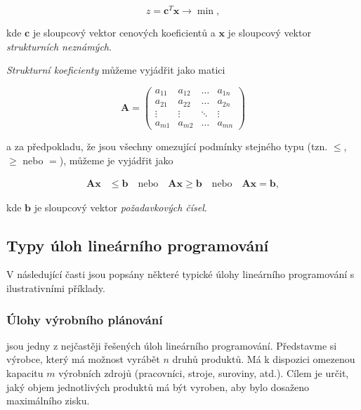 \begin{equation}
    z = \bm{c}^T\bm{x} \rightarrow \min,
\end{equation}

kde $\bm{c}$ je sloupcový vektor cenových koeficientů a $\bm{x}$ je sloupcový vektor \textit{strukturních neznámých}.

\textit{Strukturní koeficienty} můžeme vyjádřit jako matici

\begin{equation}
    \bm{A} = 
    \begin{pmatrix}
        a_{11} & a_{12} & \ldots & a_{1n} \\
        a_{21} & a_{22} & \ldots & a_{2n} \\
        \vdots & \vdots & \ddots & \vdots \\
        a_{m1} & a_{m2} & \ldots & a_{mn}
    \end{pmatrix}
\end{equation}

a za předpokladu, že jsou všechny omezující podmínky stejného typu (tzn. $\leq$, $\geq$ nebo $=$), můžeme je vyjádřit jako 

\begin{equation}
    \begin{split}
        \bm{A}\bm{x} &\leq \bm{b} \quad \text{nebo} \quad 
        \bm{A}\bm{x} \geq \bm{b} \quad \text{nebo} \quad 
        \bm{A}\bm{x} = \bm{b},
    \end{split}
    \end{equation}

kde $\bm{b}$ je sloupcový vektor \textit{požadavkových čísel}.

\subsection{Typy úloh lineárního programování}

V následující časti jsou popsány některé typické úlohy lineárního programování s ilustrativními příklady.

\subsubsection{Úlohy výrobního plánování}
jsou jedny z nejčastěji řešených úloh lineárního programování.
Představme si výrobce, který má možnost vyrábět $n$ druhů produktů.
Má k dispozici omezenou kapacitu $m$ výrobních zdrojů (pracovníci, stroje, suroviny, atd.).
Cílem je určit, jaký objem jednotlivých produktů má být vyroben, aby bylo dosaženo maximálního zisku.

